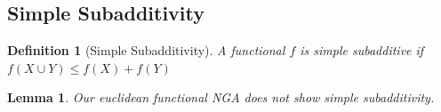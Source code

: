 \documentclass{article}
\theoremstyle{define}
\newtheorem{define}{Definition}[section]
\newtheorem{lemma}[theorem]{Lemma}
\theoremstyle{remark}
\begin{document}



\subsection{Simple Subadditivity}
\begin{define}[Simple Subadditivity]
    \textit{A functional $f$ is simple subadditive if $f(X \cup Y) \leq f(X) + f(Y)$}
\end{define}


\begin{lemma}
    Our euclidean functional \textsf{NGA} does not show simple subadditivity.
\end{lemma}
\end{document}
